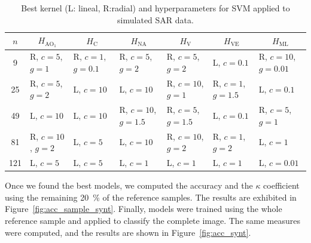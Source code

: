 \documentclass[journal]{IEEEtran}
\begin{document}

\begin{table}[htbp]
	\centering
	\caption{Best kernel (L: lineal, R:radial) and hyperparameters for SVM applied to simulated SAR data.}
	\label{tab:hyperparameters}
	\begin{tabular}{cllllll}
		\toprule
		$n$ & \multicolumn{1}{c}{$H_{\text{AO}_1}$} & \multicolumn{1}{c}{$H_\text{C}$} & \multicolumn{1}{c}{$H_{\text{NA}}$} & \multicolumn{1}{c}{$H_\text{V}$} & \multicolumn{1}{c}{$H_{\text{VE}}$} & \multicolumn{1}{c}{$H_{\text{ML}}$} \\
		\midrule
		9     & R, $c=5$, $g=1$ & R, $c=1$, $g=0.1$ & R, $c=5$, $g=2$ & R, $c=5$, $g=2$ & L, $c=0.1$ & R, $c=10$, $g=0.01$ \\
		25    & R, $c=5$, $g=2$ & L, $c=10$ & L, $c=10$ & R, $c=10$, $g=1$ & R, $c=1$, $g=1.5$ & L, $c=0.1$ \\
		49    & L, $c=10$ & L, $c=10$ & R, $c=10$, $g=1.5$ & R, $c=5$, $g=1.5$ & L, $c=0.1$ & R, $c=5$, $g=1$ \\
		81    & R, $c=10$, $g=2$ & L, $c=5$ & L, $c=10$ & R, $c=10$, $g=2$ & R, $c=1$, $g=2$ & L, $c=1$ \\
		121   & L, $c=5$ & L, $c=5$ & L, $c=1$ & L, $c=1$ & L, $c=1$ & L, $c=0.01$ \\
		\bottomrule
	\end{tabular}
\end{table}

Once we found the best models, we computed the accuracy and the $\kappa$ coefficient using the remaining \SI{20}{\percent} of the reference samples. The results are exhibited in Figure~\ref{fig:acc_sample_synt}.
Finally, models were trained using the whole reference sample and applied to classify the complete image. 
The same measures were computed, and the results are shown in Figure~\ref{fig:acc_synt}.
\end{document}
